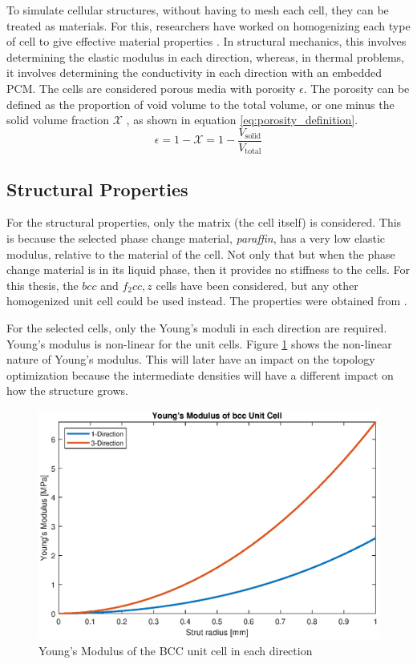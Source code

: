 To simulate cellular structures, without having to mesh each cell, they can be treated as materials. For this, researchers have worked on homogenizing each type of cell to give effective material properties \cite{Piacquadio_Soika_Schirp_Schröder_Filippeschi_2023}\cite{Bühring_Soika_Schirp-Schoenen_Schröder_2022}. In structural mechanics, this involves determining the elastic modulus in each direction, whereas, in thermal problems, it involves determining the conductivity in each direction with an embedded PCM. The cells are considered porous media with porosity $\epsilon$. The porosity can be defined as the proportion of void volume to the total volume, or one minus the solid volume fraction $\mathcal{X}$ \cite{Piacquadio_Soika_Schirp_Schröder_Filippeschi_2023}, as shown in equation \ref{eq:porosity_definition}.
\begin{equation}
    \epsilon = 1 - \mathcal{X} = 1 - \frac{V_\text{solid}}{V_\text{total}}
    \label{eq:porosity_definition}
\end{equation} 

\subsection*{Structural Properties}
For the structural properties, only the matrix (the cell itself) is considered. This is because the selected phase change material, \emph{paraffin}, has a very low elastic modulus, relative to the material of the cell. Not only that but when the phase change material is in its liquid phase, then it provides no stiffness to the cells. For this thesis, the $bcc$ and $f_2 cc,z$ cells have been considered, but any other homogenized unit cell could be used instead. The properties were obtained from \cite{Bühring_Soika_Schirp-Schoenen_Schröder_2022}.

For the selected cells, only the Young's moduli in each direction are required. Young's modulus is non-linear for the unit cells. Figure \ref{fig:youngs_modulus_bcc_e1} shows the non-linear nature of Young's modulus. This will later have an impact on the topology optimization because the intermediate densities will have a different impact on how the structure grows.
\begin{figure}[ht]
    \centering
    \includegraphics[width=0.9\linewidth]{figures/chapter_3/BCC_E1.eps}
    \caption{Young's Modulus of the BCC unit cell in each direction}
    \label{fig:youngs_modulus_bcc_e1}
\end{figure}


